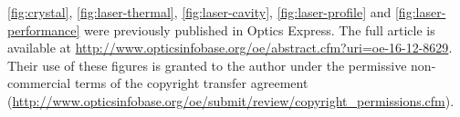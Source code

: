 \noindent \ref{fig:crystal}, \ref{fig:laser-thermal}, \ref{fig:laser-cavity}, \ref{fig:laser-profile} and \ref{fig:laser-performance} were previously published in Optics Express. The full article is available at \url{http://www.opticsinfobase.org/oe/abstract.cfm?uri=oe-16-12-8629}. Their use of these figures is granted to the author under the permissive non-commercial terms of the copyright transfer agreement (\url{http://www.opticsinfobase.org/oe/submit/review/copyright_permissions.cfm}).
